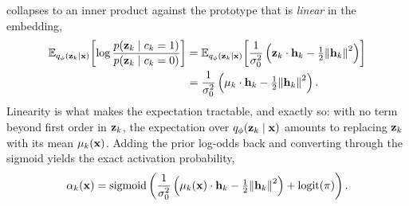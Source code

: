 collapses to an inner product against the prototype that is \textit{linear} in
the embedding,
\begin{equation*}
    \begin{split}
        \E[q_{\phi}(\vb{z}_{k} \mid \vb{x})]{\log \frac{p(\vb{z}_k \mid c_k = 1)}{p(\vb{z}_k \mid c_k = 0)}} &=
        \E[q_{\phi}(\vb{z}_{k} \mid \vb{x})]{\frac{1}{\sigma_0^2}\left(\vb{z}_k \cdot \vb{h}_k - \tfrac{1}{2}\norm{\vb{h}_k}^2\right)}\\
        &= \frac{1}{\sigma_0^2}\left(\vb{\mu}_k \cdot \vb{h}_k - \tfrac{1}{2}\norm{\vb{h}_k}^2\right).
    \end{split}
\end{equation*}
Linearity is what makes the expectation tractable, and exactly so: with no term
beyond first order in $\vb{z}_k$, the expectation over
$q_\phi({\vb{z}_k \mid \vb{x}})$ amounts to replacing $\vb{z}_k$ with its mean
$\vb{\mu}_k(\vb{x})$. Adding the prior log-odds back and converting through the
sigmoid yields the exact activation probability,
\begin{equation} \label{eq:methods:proba:alpha-exact}
    \alpha_k(\vb{x}) = \on{sigmoid}\left(
    \frac{1}{\sigma_0^2}\left(\vb{\mu}_k(\vb{x}) \cdot \vb{h}_k
    - \tfrac{1}{2}\norm{\vb{h}_k}^2\right) + \on{logit}(\pi)
    \right).
\end{equation}

